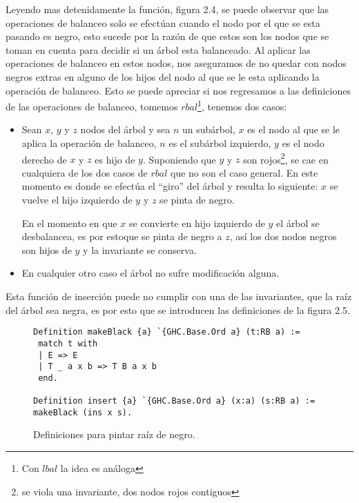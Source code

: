 Leyendo mas detenidamente la funci\'on, figura 2.4, se puede observar que las operaciones de
balanceo solo se efectúan cuando el nodo por el que se esta pasando es negro, esto sucede por la
raz\'on de que estos son los nodos  que se toman en cuenta para decidir si un \'arbol esta
balanceado. Al aplicar las operaciones de balanceo en estos nodos, nos aseguramos de no quedar con
nodos negros extras en alguno de los hijos del nodo al que se le esta aplicando la operación de
balanceo. Esto se puede apreciar si nos regresamos a las definiciones de las operaciones de
balanceo, tomemos $rbal$\footnote{Con $lbal$ la idea es an\'aloga}, tenemos dos casos:

\begin{itemize}
    \item Sean $x$, $y$ y $z$ nodos del \'arbol y sea $n$ un subárbol, $x$ es el nodo al que se le
    aplica la operaci\'on de balanceo, $n$ es el subárbol izquierdo, $y$ es el nodo derecho  de $x$
    y $z$ es hijo de $y$. Suponiendo que $y$ y $z$ son rojos\footnote{se viola una invariante, dos
    nodos rojos contiguos}, se cae en cualquiera de los dos casos de $rbal$ que no son el caso
    general. En este momento es donde se efectúa el ``giro'' del árbol y resulta lo siguiente: $x$
    se vuelve el hijo izquierdo de $y$ y $z$ se pinta de negro.

    En el momento en que $x$ se convierte en hijo izquierdo de $y$ el \'arbol se desbalancea, es
    por estoque se pinta de negro a $z$, así los dos nodos negros son hijos de $y$ y la invariante
    se conserva.
    \item En cualquier otro caso el \'arbol no sufre modificaci\'on alguna.
\end{itemize}{}

Esta función de inserción puede no cumplir con una de las invariantes, que la raíz del árbol sea
negra, es por esto que se introducen las definiciones de la figura 2.5.

\begin{figure}
\centering
\captionsetup{justification=centering}
\begin{verbatim}
Definition makeBlack {a} `{GHC.Base.Ord a} (t:RB a) :=
 match t with
 | E => E
 | T _ a x b => T B a x b
 end.

Definition insert {a} `{GHC.Base.Ord a} (x:a) (s:RB a) := makeBlack (ins x s).
\end{verbatim}
\caption{Definiciones para pintar ra\'iz de negro.}
\end{figure}

